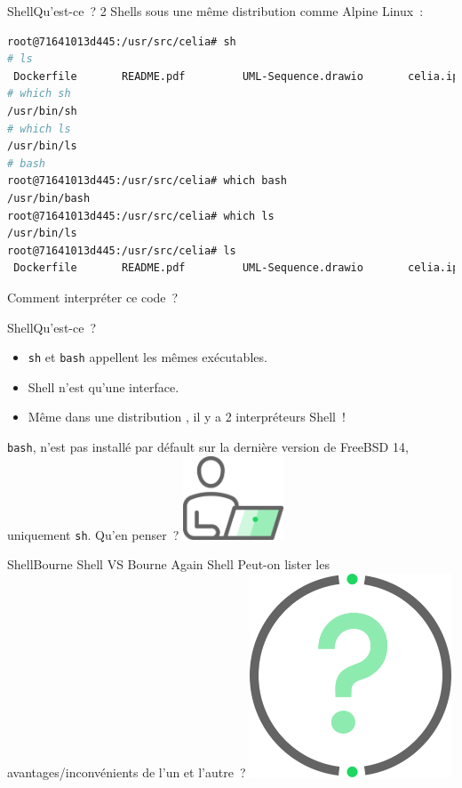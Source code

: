 \documentclass{beamer}
\begin{document}
    \begin{frame}[fragile]{Shell}{Qu'est-ce~?}
        2 Shells sous une même distribution  comme Alpine Linux~:
        \begin{lstlisting}[language=bash]
root@71641013d445:/usr/src/celia# sh
# ls
 Dockerfile       README.pdf         UML-Sequence.drawio       celia.ipynb
# which sh
/usr/bin/sh
# which ls
/usr/bin/ls
# bash
root@71641013d445:/usr/src/celia# which bash
/usr/bin/bash
root@71641013d445:/usr/src/celia# which ls
/usr/bin/ls
root@71641013d445:/usr/src/celia# ls
 Dockerfile       README.pdf         UML-Sequence.drawio       celia.ipynb
        \end{lstlisting}
        \bigbreak
        Comment interpréter ce code~?
    \end{frame}

    \begin{frame}{Shell}{Qu'est-ce~?}
        \begin{itemize}
            \item \lstinline{sh} et \lstinline{bash} appellent les mêmes exécutables.
            \item Shell n'est qu'une interface.
            \item Même dans une distribution , il y a 2 interpréteurs Shell~!
        \end{itemize}
        \bigbreak
        \lstinline{bash}, n'est pas installé par défault sur la dernière version de FreeBSD 14, uniquement \lstinline{sh}.
        Qu'en penser~?
        \bigbreak
        \centering
        \includegraphics[width=3cm]{image/guy-in-front-of-desktop}
    \end{frame}

    \begin{frame}{Shell}{Bourne Shell VS Bourne Again Shell}
        Peut-on lister les avantages/inconvénients de l'un et l'autre~?
        \bigbreak
        \centering
        \includegraphics[width=6cm]{image/question-mark}
    \end{frame}
\end{document}
